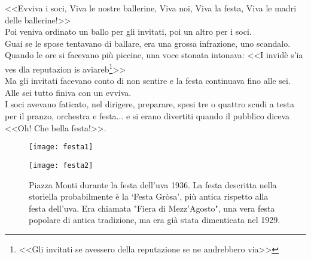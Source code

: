 \indent <<Evviva i soci, Viva le nostre ballerine, Viva noi, Viva la festa, Viva le madri delle ballerine!>>\\
\indent Poi veniva ordinato un ballo per gli invitati, poi un altro per i soci.\\
\indent Guai se le spose tentavano di ballare, era una grossa infrazione, uno scandalo.\\
\indent Quando le ore si facevano più piccine, una voce stonata intonava: <<I invidè s'ia ves dla reputazion is aviareb\footnote{<<Gli invitati se avessero della reputazione se ne andrebbero via>>}>>\\
\indent Ma gli invitati facevano conto di non sentire e la festa continuava fino alle sei. Alle sei tutto finiva con un evviva.\\
\indent I soci avevano faticato, nel dirigere, preparare, spesi tre o quattro scudi a testa per il pranzo, orchestra e festa... e si erano divertiti quando il pubblico diceva <<Oh! Che bella festa!>>.

\begin{figure}[htb]
    \centering
        \texttt{[image: festa1]}
    \vspace{-0.8cm}
\end{figure}

\begin{figure}[htb]
    \centering
    \vspace{-0.45cm}
    \texttt{[image: festa2]}
    \caption[Festa dell'uva]{Piazza Monti durante la festa dell'uva 1936. La festa descritta nella storiella probabilmente è la `Festa Gròsa', più antica rispetto alla festa dell'uva. Era chiamata "Fiera di Mezz'Agosto", una vera festa popolare di antica tradizione, ma era già stata dimenticata nel 1929.  \label{fig:festa2}}
    \vspace{-0.8cm}
\end{figure}
